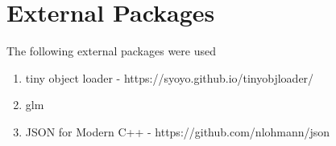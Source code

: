 \section{External Packages}
The following external packages were used 
\begin{enumerate}
    \item tiny object loader - https://syoyo.github.io/tinyobjloader/
    \item glm
    \item JSON for Modern C++ - https://github.com/nlohmann/json
\end{enumerate}

